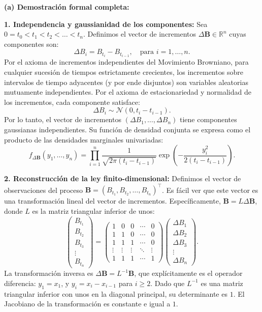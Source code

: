 \documentclass[11pt, letterpaper]{article}
\begin{document}
\begin{solucion}
    \vspace{3mm}
    \textbf{(a) Demostración formal completa:}
    
    \textbf{1. Independencia y gaussianidad de los componentes:}
    Sea $0 = t_0 < t_1 < t_2 < \dots < t_n$. Definimos el vector de incrementos $\Delta \mathbf{B} \in \mathbb{R}^n$ cuyas componentes son:
    \[ \Delta B_i = B_{t_i} - B_{t_{i-1}}, \quad \text{para } i = 1, \dots, n. \]
    Por el axioma de incrementos independientes del Movimiento Browniano, para cualquier sucesión de tiempos estrictamente crecientes, los incrementos sobre intervalos de tiempo adyacentes (y por ende disjuntos) son variables aleatorias mutuamente independientes. 
    Por el axioma de estacionariedad y normalidad de los incrementos, cada componente satisface:
    \[ \Delta B_i \sim \mathcal{N}(0, t_i - t_{i-1}). \]
    Por lo tanto, el vector de incrementos $(\Delta B_1, \dots, \Delta B_n)$ tiene componentes gaussianas independientes. Su función de densidad conjunta se expresa como el producto de las densidades marginales univariadas:
    \[ f_{\Delta \mathbf{B}}(y_1, \dots, y_n) = \prod_{i=1}^n \frac{1}{\sqrt{2\pi(t_i - t_{i-1})}} \exp\left( -\frac{y_i^2}{2(t_i - t_{i-1})} \right). \]

    \textbf{2. Reconstrucción de la ley finito-dimensional:}
    Definimos el vector de observaciones del proceso $\mathbf{B} = (B_{t_1}, B_{t_2}, \dots, B_{t_n})^\top$. 
    Es fácil ver que este vector es una transformación lineal del vector de incrementos. Específicamente, $\mathbf{B} = L \Delta \mathbf{B}$, donde $L$ es la matriz triangular inferior de unos:
    \[ 
    \begin{pmatrix} 
    B_{t_1} \\ B_{t_2} \\ B_{t_3} \\ \vdots \\ B_{t_n} 
    \end{pmatrix} 
    = 
    \begin{pmatrix} 
    1 & 0 & 0 & \cdots & 0 \\
    1 & 1 & 0 & \cdots & 0 \\
    1 & 1 & 1 & \cdots & 0 \\
    \vdots & \vdots & \vdots & \ddots & \vdots \\
    1 & 1 & 1 & \cdots & 1
    \end{pmatrix}
    \begin{pmatrix} 
    \Delta B_1 \\ \Delta B_2 \\ \Delta B_3 \\ \vdots \\ \Delta B_n 
    \end{pmatrix}.
    \]
    La transformación inversa es $\Delta \mathbf{B} = L^{-1} \mathbf{B}$, que explícitamente es el operador diferencia: $y_1 = x_1$, y $y_i = x_i - x_{i-1}$ para $i \ge 2$.
    Dado que $L^{-1}$ es una matriz triangular inferior con unos en la diagonal principal, su determinante es $1$. El Jacobiano de la transformación es constante e igual a $1$.


\end{solucion}
\end{document}

